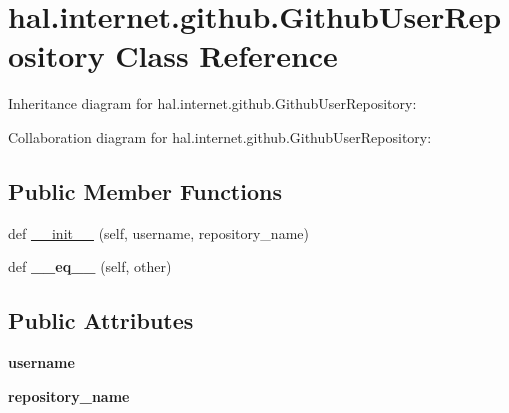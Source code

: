 \hypertarget{classhal_1_1internet_1_1github_1_1_github_user_repository}{}\section{hal.\+internet.\+github.\+Github\+User\+Repository Class Reference}
\label{classhal_1_1internet_1_1github_1_1_github_user_repository}


Inheritance diagram for hal.\+internet.\+github.\+Github\+User\+Repository\+:


Collaboration diagram for hal.\+internet.\+github.\+Github\+User\+Repository\+:
\subsection*{Public Member Functions}
\begin{DoxyCompactItemize}
\item 
def \hyperlink{classhal_1_1internet_1_1github_1_1_github_user_repository_a79694718986eddd6ac6b67cc83a8ee49}{\+\_\+\+\_\+init\+\_\+\+\_\+} (self, username, repository\+\_\+name)
\item 
def {\bfseries \+\_\+\+\_\+eq\+\_\+\+\_\+} (self, other)\hypertarget{classhal_1_1internet_1_1github_1_1_github_user_repository_a06a2484ebac5b3ae523bae66dd27df1a}{}\label{classhal_1_1internet_1_1github_1_1_github_user_repository_a06a2484ebac5b3ae523bae66dd27df1a}

\end{DoxyCompactItemize}
\subsection*{Public Attributes}
\begin{DoxyCompactItemize}
\item 
{\bfseries username}\hypertarget{classhal_1_1internet_1_1github_1_1_github_user_repository_abac96e3d18bbc70cf346ef71cb824327}{}\label{classhal_1_1internet_1_1github_1_1_github_user_repository_abac96e3d18bbc70cf346ef71cb824327}

\item 
{\bfseries repository\+\_\+name}\hypertarget{classhal_1_1internet_1_1github_1_1_github_user_repository_a1458f4d8974574d088e46a0ff1c65fca}{}\label{classhal_1_1internet_1_1github_1_1_github_user_repository_a1458f4d8974574d088e46a0ff1c65fca}

\end{DoxyCompactItemize}
